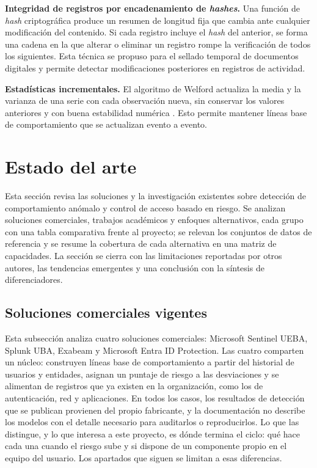 \textbf{Integridad de registros por encadenamiento de \emph{hashes}.} Una función de \emph{hash} criptográfica produce un resumen de longitud fija que cambia ante cualquier modificación del contenido. Si cada registro incluye el \emph{hash} del anterior, se forma una cadena en la que alterar o eliminar un registro rompe la verificación de todos los siguientes. Esta técnica se propuso para el sellado temporal de documentos digitales \parencite{Haber1991} y permite detectar modificaciones posteriores en registros de actividad.

\textbf{Estadísticas incrementales.} El algoritmo de Welford actualiza la media y la varianza de una serie con cada observación nueva, sin conservar los valores anteriores y con buena estabilidad numérica \parencite{Welford1962}. Esto permite mantener líneas base de comportamiento que se actualizan evento a evento.


\section{Estado del arte}
\label{sec:estado-del-arte}

Esta sección revisa las soluciones y la investigación existentes sobre detección de comportamiento anómalo y control de acceso basado en riesgo. Se analizan soluciones comerciales, trabajos académicos y enfoques alternativos, cada grupo con una tabla comparativa frente al proyecto; se relevan los conjuntos de datos de referencia y se resume la cobertura de cada alternativa en una matriz de capacidades. La sección se cierra con las limitaciones reportadas por otros autores, las tendencias emergentes y una conclusión con la síntesis de diferenciadores.


\subsection{Soluciones comerciales vigentes}

Esta subsección analiza cuatro soluciones comerciales: Microsoft Sentinel UEBA, Splunk UBA, Exabeam y Microsoft Entra ID Protection. Las cuatro comparten un núcleo: construyen líneas base de comportamiento a partir del historial de usuarios y entidades, asignan un puntaje de riesgo a las desviaciones y se alimentan de registros que ya existen en la organización, como los de autenticación, red y aplicaciones. En todos los casos, los resultados de detección que se publican provienen del propio fabricante, y la documentación no describe los modelos con el detalle necesario para auditarlos o reproducirlos. Lo que las distingue, y lo que interesa a este proyecto, es dónde termina el ciclo: qué hace cada una cuando el riesgo sube y si dispone de un componente propio en el equipo del usuario. Los apartados que siguen se limitan a esas diferencias.


